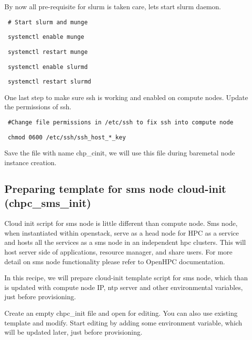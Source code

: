 \begin{section}
By now all pre-requisite for slurm is taken care, lets start slurm daemon.

\begin{bash}\texttt{\small{ \# Start slurm and munge }}\end{bash}
\begin{bash}\texttt{\small{ systemctl enable munge}}\end{bash}
\begin{bash}\texttt{\small{ systemctl restart munge}}\end{bash}
\begin{bash}\texttt{\small{ systemctl enable slurmd}}\end{bash}
\begin{bash}\texttt{\small{ systemctl restart slurmd}}\end{bash}

One last step to make sure ssh is working and enabled on compute nodes. Update the permissions of ssh.

\begin{bash}\texttt{\small{ \#Change file permissions in /etc/ssh to fix ssh into compute node}}\end{bash}
\begin{bash}\texttt{\small{ chmod 0600 /etc/ssh/ssh\_host\_*\_key}}\end{bash}

Save the file with name chp\_cinit, we will use this file during baremetal node instance creation.

\subsection[]{Preparing template for sms node cloud-init (chpc\_sms\_init)}

Cloud init script for sms node is little different than compute node. Sms node, when instantiated within openstack, serve as a head node for HPC as a service and hosts all the services as a sms node in an independent hpc clusters. This will host server side of applications, resource manager, and share users. For more detail on sms node functionality please refer to OpenHPC documentation.

In this recipe, we will prepare cloud-init template script for sms node, which than is updated with compute node IP, ntp server and other environmental variables, just before provisioning. 

Create an empty chpc\_init file and open for editing. You can also use existing template and modify. Start editing by adding some environment variable, which will be updated later, just before provisioning.


\end{section}
